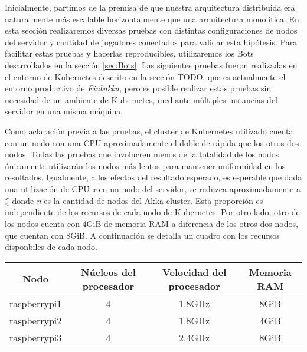 
\noindent Inicialmente, partimos de la premisa de que nuestra arquitectura distribuida era naturalmente más escalable horizontalmente
que una arquitectura monolítica. En esta sección realizaremos diversas pruebas con distintas configuraciones de nodos del servidor y cantidad
de jugadores conectados para validar esta hipótesis. Para facilitar estas pruebas y hacerlas reproducibles, utilizaremos los Bots desarrollados
en la sección \ref{sec:Bots}. Las siguientes pruebas fueron realizadas en el entorno de Kubernetes descrito en la sección TODO, que es actualmente el entorno
productivo de \textit{Fiubakka}, pero es posible realizar estas pruebas sin necesidad de un ambiente de Kubernetes, mediante múltiples instancias del
servidor en una misma máquina.

Como aclaración previa a las pruebas, el cluster de Kubernetes utilizado cuenta con un nodo con una CPU aproximadamente el doble de rápida que los otros dos nodos.
Todas las pruebas que involucren menos de la totalidad de los nodos únicamente utilizarán los nodos más lentos para mantener uniformidad en los resultados.
Igualmente, a los efectos del resultado esperado, es esperable que dada una utilización de CPU \textit{x} en un nodo del servidor, se reduzca aproximadamente a
$\frac{x}{n}$ donde \textit{n} es la cantidad de nodos del Akka cluster. Esta proporción es independiente de los recursos de cada nodo de Kubernetes. Por otro lado,
otro de los nodos cuenta con 4GiB de memoria RAM a diferencia de los otros dos nodos, que cuentan con 8GiB. A continuación se detalla un cuadro con los recursos disponbiles
de cada nodo.

\begin{center}
\begin{tabular}{|c|c|c|c|}
    \hline
    \textbf{Nodo} & \textbf{Núcleos del procesador} & \textbf{Velocidad del procesador} & \textbf{Memoria RAM} \\
    \hline
    raspberrypi1 & 4 & 1.8GHz & 8GiB \\
    \hline
    raspberrypi2 & 4 & 1.8GHz & 4GiB \\
    \hline
    raspberrypi3 & 4 & 2.4GHz & 8GiB \\
    \hline
\end{tabular}
\end{center}

